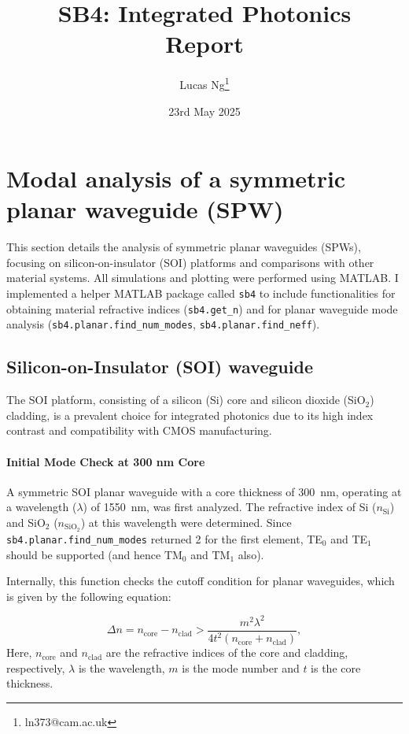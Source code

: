 \documentclass[10pt, a4paper]{article}
\title{\Large \bfseries SB4: Integrated Photonics\\[0.5em] \large Report}
\author{Lucas Ng\thanks{ln373@cam.ac.uk}}
\date{23rd May 2025}
\begin{document}
\maketitle

\section{Modal analysis of a symmetric planar waveguide (SPW)}
This section details the analysis of symmetric planar waveguides (SPWs), focusing on silicon-on-insulator (SOI) platforms and comparisons with other material systems. All simulations and plotting were performed using MATLAB. I implemented a helper MATLAB package called \texttt{sb4} to include functionalities for obtaining material refractive indices (\texttt{sb4.get\_n}) and for planar waveguide mode analysis (\texttt{sb4.planar.find\_num\_modes}, \texttt{sb4.planar.find\_neff}).

\subsection{Silicon-on-Insulator (SOI) waveguide}
The SOI platform, consisting of a silicon (Si) core and silicon dioxide (SiO$_2$) cladding, is a prevalent choice for integrated photonics due to its high index contrast and compatibility with CMOS manufacturing.

\paragraph{Initial Mode Check at 300 nm Core}
A symmetric SOI planar waveguide with a core thickness of 300~nm, operating at a wavelength ($\lambda$) of 1550~nm, was first analyzed. The refractive index of Si ($n_{\text{Si}}$) and SiO$_2$ ($n_{\text{SiO}_2}$) at this wavelength were determined. Since \texttt{sb4.planar.find\_num\_modes} returned 2 for the first element, TE$_0$ and TE$_1$ should be supported (and hence TM$_0$ and TM$_1$ also).

Internally, this function checks the cutoff condition for planar waveguides, which is given by the following equation:

\begin{equation}
    \Delta n = n_{\text{core}} - n_{\text{clad}} > \frac{m^2\lambda^2}{4t^2(n_{\text{core}}+ n_{\text{clad}})},
\end{equation}
Here, $n_{\text{core}}$ and $n_{\text{clad}}$ are the refractive indices of the core and cladding, respectively, $\lambda$ is the wavelength, $m$ is the mode number and $t$ is the core thickness.
\end{document}

